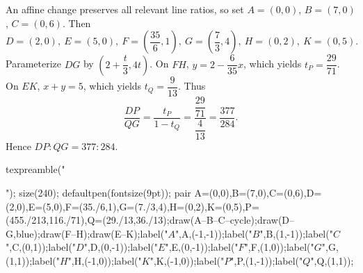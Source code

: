 An affine change preserves all relevant line ratios, so set $A=(0,0)$, $B=(7,0)$, $C=(0,6)$. Then
\[
D=(2,0),\ E=(5,0),\ F=\left(\dfrac{35}{6},1\right),\
G=\left(\dfrac{7}{3},4\right),\ H=(0,2),\ K=(0,5).
\]
Parameterize $DG$ by $\left(2+\dfrac{t}{3},4t\right)$. On $FH$, $y=2-\dfrac{6}{35}x$, which yields $t_P=\dfrac{29}{71}$. On $EK$, $x+y=5$, which yields $t_Q=\dfrac{9}{13}$. Thus
\[
\dfrac{DP}{QG}=\dfrac{t_P}{1-t_Q}
=\dfrac{\dfrac{29}{71}}{\dfrac{4}{13}}=\dfrac{377}{284}.
\]
Hence $\boxed{DP:QG=377:284}$.
\begin{asy}
texpreamble("\usepackage{amsmath,amssymb}");
size(240);
defaultpen(fontsize(9pt));
pair A=(0,0),B=(7,0),C=(0,6),D=(2,0),E=(5,0),F=(35./6,1),G=(7./3,4),H=(0,2),K=(0,5),P=(455./213,116./71),Q=(29./13,36./13);draw(A--B--C--cycle);draw(D--G,blue);draw(F--H);draw(E--K);label("$A$",A,(-1,-1));label("$B$",B,(1,-1));label("$C$",C,(0,1));label("$D$",D,(0,-1));label("$E$",E,(0,-1));label("$F$",F,(1,0));label("$G$",G,(1,1));label("$H$",H,(-1,0));label("$K$",K,(-1,0));label("$P$",P,(1,-1));label("$Q$",Q,(1,1));
\end{asy}
